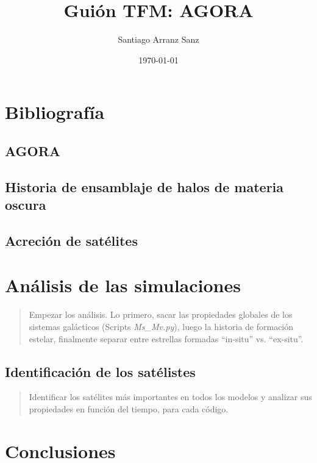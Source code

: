 \documentclass{article}
\title{Guión TFM: AGORA}
\author{Santiago Arranz Sanz }
\date{\today}
\begin{document}
\maketitle


\section{Bibliografía}

\subsection{AGORA}

\cite{kim2016agora, kim2013agora}

\subsection{Historia de ensamblaje de halos de materia oscura}

\subsection{Acreción de satélites}

\section{Análisis de las simulaciones}
\begin{quote}
Empezar los análisis. Lo primero, sacar las propiedades globales de los sistemas galácticos (Scripts \textit{Ms\_Mv.py}), luego la historia de formación estelar, finalmente separar entre estrellas formadas ``in-situ'' vs. ``ex-situ''.
\end{quote}

\subsection{Identificación de los satélistes}
\begin{quote}
 Identificar los satélites más importantes en todos los modelos y analizar sus propiedades en función del tiempo, para cada código.
\end{quote}

\section{Conclusiones}

\newpage


\end{document}

